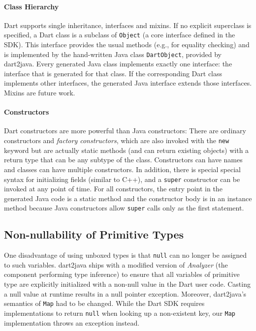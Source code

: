 \documentclass[sigplan,9pt]{acmart}
\begin{document}
\paragraph{Class Hierarchy}
Dart supports single inheritance, interfaces and mixins. If no explicit superclass is specified, a Dart class is a subclass of \texttt{Object} (a core interface defined in the SDK). This interface provides the usual methods (e.g., for equality checking) and is implemented by the hand-written Java class \texttt{DartObject}, provided by dart2java. Every generated Java class implements exactly one interface: the interface that is generated for that class. If the corresponding Dart class implements other interfaces, the generated Java interface extends those interfaces. Mixins are future work.

\paragraph{Constructors}
Dart constructors are more powerful than Java constructors: There are ordinary constructors and \emph{factory constructors}, which are also invoked with the \texttt{new} keyword but are actually static methods (and can return existing objects) with a return type that can be any subtype of the class. Constructors can have names and classes can have multiple constructors. In addition, there is special special syntax for initializing fields (similar to C++), and a \texttt{super} constructor can be invoked at any point of time. For all constructors, the entry point in the generated Java code is a static method and the constructor body is in an instance method because Java constructors allow \texttt{super} calls only as the first statement.

\subsection{Non-nullability of Primitive Types}
One disadvantage of using unboxed types is that \texttt{null} can no longer be assigned to such variables. dart2java ships with a modified version of \emph{Analyzer} (the component performing type inference) to ensure that all variables of primitive type are explicitly initialized with a non-null value in the Dart user code. Casting a null value at runtime results in a null pointer exception. Moreover, dart2java's semantics of \texttt{Map} had to be changed. While the Dart SDK requires implementations to return \texttt{null} when looking up a non-existent key, our \texttt{Map} implementation throws an exception instead.
\end{document}
